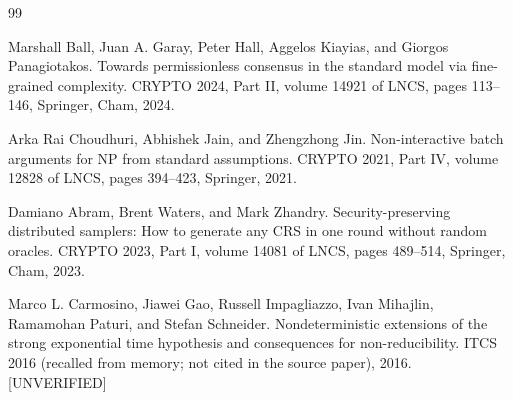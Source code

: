 \documentclass{aicr-conjecture}
\begin{document}
\begin{aicrbibliography}{99}

Marshall Ball, Juan A. Garay, Peter Hall, Aggelos Kiayias, and Giorgos Panagiotakos.
Towards permissionless consensus in the standard model via fine-grained complexity.
CRYPTO 2024, Part II, volume 14921 of LNCS, pages 113--146, Springer, Cham, 2024.

Arka Rai Choudhuri, Abhishek Jain, and Zhengzhong Jin.
Non-interactive batch arguments for NP from standard assumptions.
CRYPTO 2021, Part IV, volume 12828 of LNCS, pages 394--423, Springer, 2021.

Damiano Abram, Brent Waters, and Mark Zhandry.
Security-preserving distributed samplers: How to generate any CRS in one round without random oracles.
CRYPTO 2023, Part I, volume 14081 of LNCS, pages 489--514, Springer, Cham, 2023.

Marco L. Carmosino, Jiawei Gao, Russell Impagliazzo, Ivan Mihajlin, Ramamohan Paturi, and Stefan Schneider.
Nondeterministic extensions of the strong exponential time hypothesis and consequences for non-reducibility.
ITCS 2016 (recalled from memory; not cited in the source paper), 2016.
[UNVERIFIED]

\end{aicrbibliography}
\end{document}
